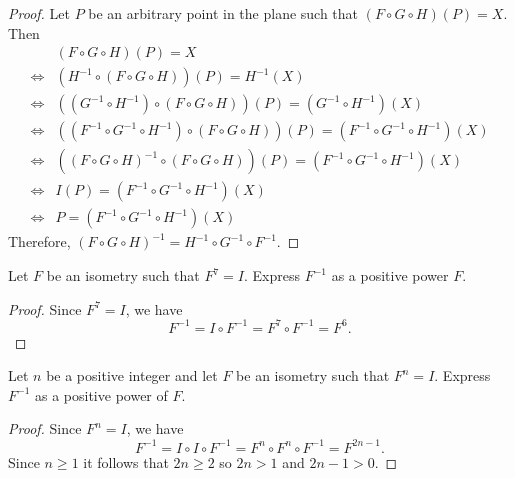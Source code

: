 \begin{proof}
    Let $P$ be an arbitrary point in the plane such that $(F \circ G \circ H)(P) = X$.
    Then 
    \begin{align*}
        &(F \circ G \circ H)(P) = X \\
        \iff& (H^{-1} \circ (F \circ G \circ H))(P) = H^{-1}(X) \\
        \iff& ((G^{-1} \circ H^{-1}) \circ (F \circ G \circ H))(P) = (G^{-1} \circ H^{-1})(X) \\
        \iff& ((F^{-1} \circ G^{-1} \circ H^{-1}) \circ (F \circ G \circ H))(P) = (F^{-1} \circ G^{-1} \circ H^{-1})(X) \\
        \iff& ((F \circ G \circ H)^{-1} \circ (F \circ G \circ H))(P) = (F^{-1} \circ G^{-1} \circ H^{-1})(X) \\
        \iff& I(P) = (F^{-1} \circ G^{-1} \circ H^{-1})(X) \\
        \iff& P = (F^{-1} \circ G^{-1} \circ H^{-1})(X)
    \end{align*}
    Therefore, $(F \circ G \circ H)^{-1} = H^{-1} \circ G^{-1} \circ F^{-1}$.
\end{proof}

\begin{tcolorbox}[title=Problem 7, breakable]
    Let $F$ be an isometry such that $F^7 = I$.
    Express $F^{-1}$ as a positive power $F$.
\end{tcolorbox}

\begin{proof}
Since $F^7 = I$, we have
\[
F^{-1} = I \circ F^{-1} = F^7 \circ F^{-1} = F^6.
\]
\end{proof}

\begin{tcolorbox}[title=Problem 8, breakable]
    Let $n$ be a positive integer and let $F$ be an isometry such that $F^n = I$.
    Express $F^{-1}$ as a positive power of $F$.
\end{tcolorbox}

\begin{proof}
    Since $F^n = I$, we have
\[
F^{-1} = I \circ I  \circ F^{-1} = F^n \circ F^n \circ F^{-1} = F^{2n - 1}.
\]
    Since $n \ge 1$ it follows that $2n \ge 2$ so $2n > 1$ and $2n - 1 > 0$.
\end{proof}


